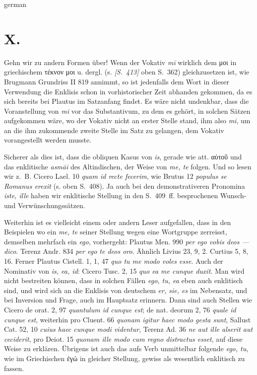 \begin{otherlanguage*}{german}
\section*{X.}

Gehn wir zu andern Formen über! Wenn der Vokativ \emph{mī} wirklich dem μοι in griechischem τέκνον μοι u. dergl. (s. \hypertarget{p413}{\emph{[S.~413]}}\label{p413} oben S.~362) gleichzusetzen ist, wie Brugmann Grundriss II 819 annimmt, so ist jedenfalls dem Wort in dieser Verwendung die Enklisis schon in vorhistorischer Zeit abhanden gekommen, da es sich bereits bei Plautus im Satzanfang findet. Es wäre nicht undenkbar, dass die Voranstellung von \emph{mi} vor das Substantivum, zu dem es gehört, in solchen Sätzen aufgekommen wäre, wo der Vokativ nicht an erster Stelle stand, ihm also \emph{mi}, um an die ihm zukommende zweite Stelle im Satz zu gelangen, dem Vokativ vorangestellt werden musste.

Sicherer als dies ist, dass die obliquen Kasus von \emph{is}, gerade wie att. αὐτοῦ und das enklitische \emph{asmāi} des Altindischen, der Weise von \emph{me, te} folgen. Und so lesen wir z.~B. Cicero Lael. 10 \emph{quam id recte fecerim}, wie Brutus 12 \emph{populus se Romanus erexit} (s. oben S.~408). Ja auch bei den demonstrativeren Pronomina \emph{iste, ille} haben wir enklitische Stellung in den S.~409~ff. besprochenen Wunsch- und Verwünschungssätzen.

Weiterhin ist es vielleicht einem oder andern Leser aufgefallen, dass in den Beispielen wo ein \emph{me, te} seiner Stellung wegen eine Wortgruppe zerreisst, demselben mehrfach ein \emph{ego}, vorhergeht: Plautus Men. 990 \emph{per ego vobis deos — dico}. Terenz Andr. 834 \emph{per ego te deos oro}. Ähnlich Livius 23, 9, 2. Curtius 5, 8, 16. Ferner Plautus Cistell. 1, 1, 47 \emph{quo tu me modo voles esse}. Auch der Nominativ von \emph{is, ea, id}: Cicero Tusc. 2, 15 \emph{quo ea me cunque duxit}. Man wird nicht bestreiten können, dass in solchen Fällen \emph{ego, tu, ea} eben auch enklitisch sind, und wird sich an die Enklisis von deutschem \emph{er, sie, es} im Nebensatz, und bei Inversion und Frage, auch im Hauptsatz erinnern. Dann sind auch Stellen wie Cicero de orat. 2, 97 \emph{quantulum id cunque est}; de nat. deorum 2, 76 \emph{quale id cunque est}, weiterhin pro Cluent. 66 \emph{quonam igitur haec modo gesta sunt}, Sallust Cat. 52, 10 \emph{cuius haec cunque modi videntur}, Terenz Ad. 36 \emph{ne aut ille alserit aut ceciderit}, pro Deiot. 15 \emph{quonam ille modo cum regno distractus esset}, auf diese Weise zu erklären. Übrigens ist auch das aufs Verb unmittelbar folgende \emph{ego, tu}, wie im Griechischen ἐγώ in gleicher Stellung, gewiss als wesentlich enklitisch zu fassen.


\end{otherlanguage*}
